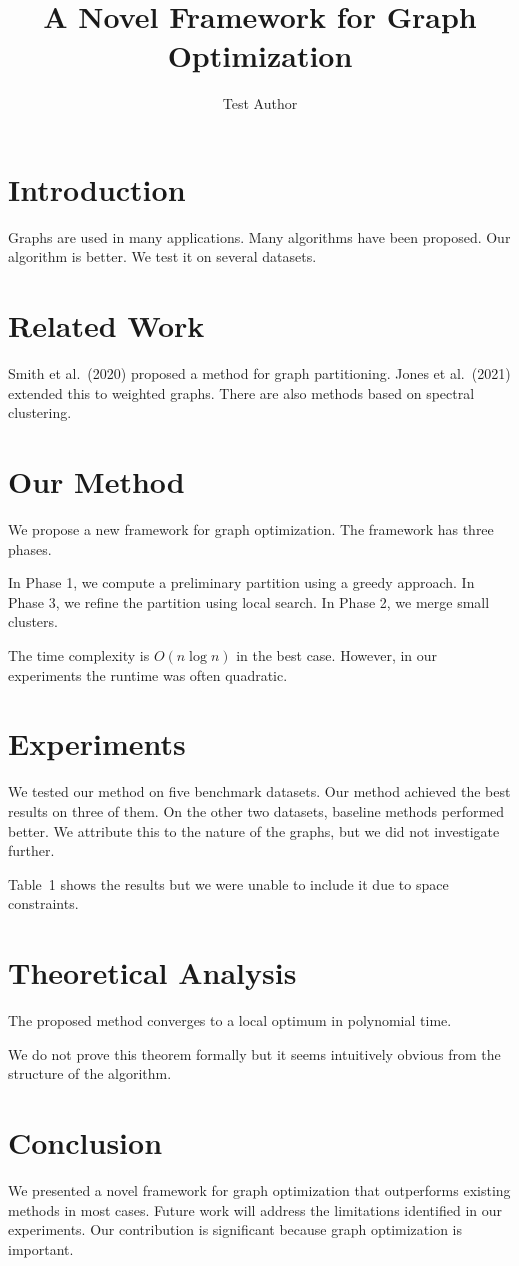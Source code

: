 \documentclass{article}
\title{A Novel Framework for Graph Optimization}
\author{Test Author}
\date{}
\begin{document}
\maketitle

\section{Introduction}
Graphs are used in many applications.
Many algorithms have been proposed.
Our algorithm is better.
We test it on several datasets.

\section{Related Work}
Smith et al.\ (2020) proposed a method for graph partitioning.
Jones et al.\ (2021) extended this to weighted graphs.
There are also methods based on spectral clustering.

\section{Our Method}
We propose a new framework for graph optimization.
The framework has three phases.

In Phase 1, we compute a preliminary partition using a greedy approach.
In Phase 3, we refine the partition using local search.
In Phase 2, we merge small clusters.

The time complexity is $O(n \log n)$ in the best case.
However, in our experiments the runtime was often quadratic.

\section{Experiments}
We tested our method on five benchmark datasets.
Our method achieved the best results on three of them.
On the other two datasets, baseline methods performed better.
We attribute this to the nature of the graphs, but we did not investigate further.

Table~1 shows the results but we were unable to include it due to space constraints.

\section{Theoretical Analysis}

\begin{theorem}
The proposed method converges to a local optimum in polynomial time.
\end{theorem}

We do not prove this theorem formally but it seems intuitively obvious from the structure of the algorithm.

\section{Conclusion}
We presented a novel framework for graph optimization that outperforms existing methods in most cases.
Future work will address the limitations identified in our experiments.
Our contribution is significant because graph optimization is important.
\end{document}
